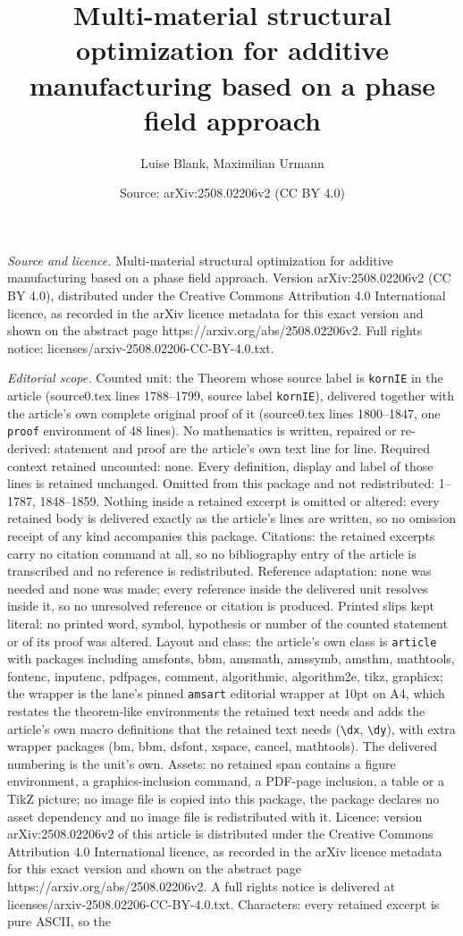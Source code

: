 \documentclass[10pt,a4paper]{amsart}
\title[Multi-material structural optimization for additive manufact]{Multi-material structural optimization for additive manufacturing based on a phase field approach}
\author{Luise Blank, Maximilian Urmann}
\date{Source: arXiv:2508.02206v2 (CC BY 4.0)}
\begin{document}
\maketitle

\noindent\emph{Source and licence.} Multi-material structural optimization for additive manufacturing based on a phase field approach. Version arXiv:2508.02206v2 (CC BY 4.0), distributed under the Creative Commons Attribution 4.0 International licence, as recorded in the arXiv licence metadata for this exact version and shown on the abstract page https://arxiv.org/abs/2508.02206v2. Full rights notice: licenses/arxiv-2508.02206-CC-BY-4.0.txt.\par\smallskip

\noindent\textit{Editorial scope.} Counted unit: the Theorem whose source label is \texttt{kornIE} in the article (source0.tex lines 1788--1799, source label \texttt{kornIE}), delivered together with the article's own complete original proof of it (source0.tex lines 1800--1847, one \texttt{proof} environment of 48 lines). No mathematics is written, repaired or re-derived: statement and proof are the article's own text line for line. Required context retained uncounted: none. Every definition, display and label of those lines is retained unchanged. Omitted from this package and not redistributed: 1--1787, 1848--1859. Nothing inside a retained excerpt is omitted or altered: every retained body is delivered exactly as the article's lines are written, so no omission receipt of any kind accompanies this package. Citations: the retained excerpts carry no citation command at all, so no bibliography entry of the article is transcribed and no reference is redistributed. Reference adaptation: none was needed and none was made; every reference inside the delivered unit resolves inside it, so no unresolved reference or citation is produced. Printed slips kept literal: no printed word, symbol, hypothesis or number of the counted statement or of its proof was altered. Layout and class: the article's own class is \texttt{article} with packages including amsfonts, bbm, amsmath, amssymb, amsthm, mathtools, fontenc, inputenc, pdfpages, comment, algorithmic, algorithm2e, tikz, graphicx; the wrapper is the lane's pinned \texttt{amsart} editorial wrapper at 10pt on A4, which restates the theorem-like environments the retained text needs and adds the article's own macro definitions that the retained text needs (\texttt{\textbackslash dx}, \texttt{\textbackslash dy}), with extra wrapper packages (bm, bbm, dsfont, xspace, cancel, mathtools). The delivered numbering is the unit's own. Assets: no retained span contains a figure environment, a graphics-inclusion command, a PDF-page inclusion, a table or a TikZ picture; no image file is copied into this package, the package declares no asset dependency and no image file is redistributed with it. Licence: version arXiv:2508.02206v2 of this article is distributed under the Creative Commons Attribution 4.0 International licence, as recorded in the arXiv licence metadata for this exact version and shown on the abstract page https://arxiv.org/abs/2508.02206v2. A full rights notice is delivered at licenses/arxiv-2508.02206-CC-BY-4.0.txt. Characters: every retained excerpt is pure ASCII, so the 
\end{document}
